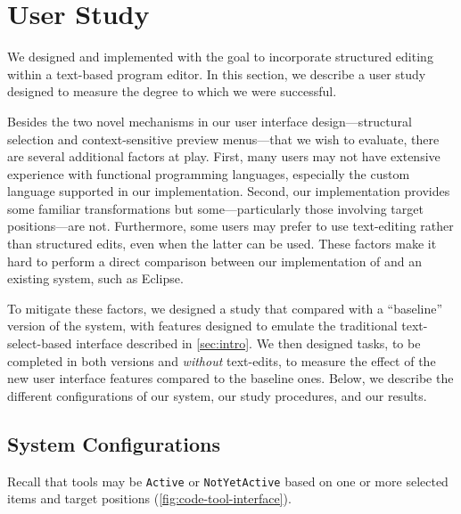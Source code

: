 \section{User Study}
\label{sec:user-study}

We designed and implemented \deuce{} with the goal to incorporate structured
editing within a text-based program editor. In this section, we describe a user
study designed to measure the degree to which we were successful.

Besides the two novel mechanisms in our user interface design---structural
\maybecode{} selection and context-sensitive preview menus---that we wish to
evaluate, there are several additional factors at play. First, many users may
not have extensive experience with functional programming languages, especially
the custom \little{} language supported in our
implementation. Second, our implementation provides some familiar
transformations but some---particularly those involving target positions---are
not. Furthermore, some users may prefer to use text-editing rather than structured
edits, even when the latter can be used. These factors make it hard to perform a
direct comparison between our implementation of \deuce{} and an existing system,
such as Eclipse.

To mitigate these factors, we designed a study that compared \deuce{} with a
``baseline'' version of the system, with features designed to emulate the
traditional text-select-based interface described in \autoref{sec:intro}. We
then designed tasks, to be completed in both versions and \emph{without}
text-edits, to measure the effect of the new \deuce{} user interface features
compared to the baseline ones. Below, we describe the different configurations
of our system, our study procedures, and our results.

\subsection{System Configurations}

\newcommand{\startInteractionList}{}
\newcommand{\interactionItem}[2]{\paragraph{(#1) #2}}
\newcommand{\finishInteractionList}{}

\newcommand{\interactionName}[1]{Interaction {#1}}



Recall that tools may be \verb+Active+ or \verb+NotYetActive+ based on one or
more selected items and target positions (\autoref{fig:code-tool-interface}).

